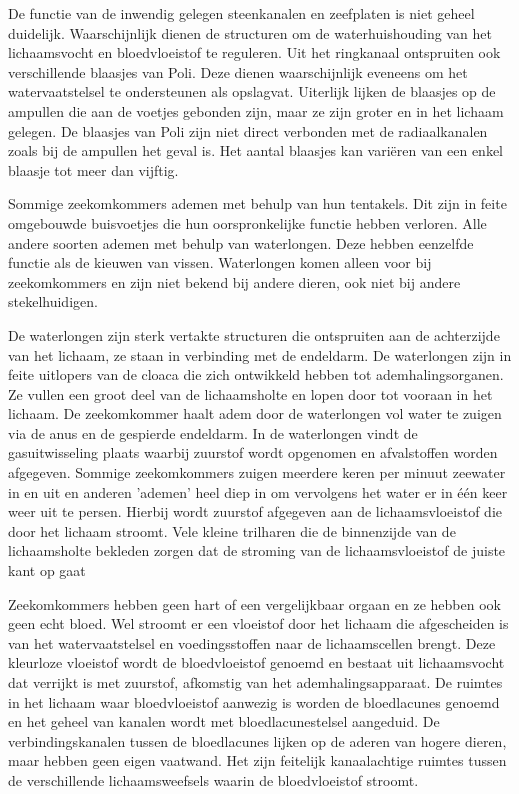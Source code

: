 De functie van de inwendig gelegen steenkanalen en zeefplaten is niet geheel duidelijk.
Waarschijnlijk dienen de structuren om de waterhuishouding van het lichaamsvocht en bloedvloeistof te reguleren.
Uit het ringkanaal ontspruiten ook verschillende blaasjes van Poli.
Deze dienen waarschijnlijk eveneens om het watervaatstelsel te ondersteunen als opslagvat.
Uiterlijk lijken de blaasjes op de ampullen die aan de voetjes gebonden zijn, maar ze zijn groter en in het lichaam gelegen.
De blaasjes van Poli zijn niet direct verbonden met de radiaalkanalen zoals bij de ampullen het geval is.
Het aantal blaasjes kan variëren van een enkel blaasje tot meer dan vijftig.

Sommige zeekomkommers ademen met behulp van hun tentakels.
Dit zijn in feite omgebouwde buisvoetjes die hun oorspronkelijke functie hebben verloren.
Alle andere soorten ademen met behulp van waterlongen.
Deze hebben eenzelfde functie als de kieuwen van vissen.
Waterlongen komen alleen voor bij zeekomkommers en zijn niet bekend bij andere dieren, ook niet bij andere stekelhuidigen.

De waterlongen zijn sterk vertakte structuren die ontspruiten aan de achterzijde van het lichaam, ze staan in verbinding met de endeldarm.
De waterlongen zijn in feite uitlopers van de cloaca die zich ontwikkeld hebben tot ademhalingsorganen.
Ze vullen een groot deel van de lichaamsholte en lopen door tot vooraan in het lichaam.
De zeekomkommer haalt adem door de waterlongen vol water te zuigen via de anus en de gespierde endeldarm.
In de waterlongen vindt de gasuitwisseling plaats waarbij zuurstof wordt opgenomen en afvalstoffen worden afgegeven.
Sommige zeekomkommers zuigen meerdere keren per minuut zeewater in en uit en anderen 'ademen' heel diep in om vervolgens het water er in één keer weer uit te persen.
Hierbij wordt zuurstof afgegeven aan de lichaamsvloeistof die door het lichaam stroomt.
Vele kleine trilharen die de binnenzijde van de lichaamsholte bekleden zorgen dat de stroming van de lichaamsvloeistof de juiste kant op gaat

Zeekomkommers hebben geen hart of een vergelijkbaar orgaan en ze hebben ook geen echt bloed.
Wel stroomt er een vloeistof door het lichaam die afgescheiden is van het watervaatstelsel en voedingsstoffen naar de lichaamscellen brengt.
Deze kleurloze vloeistof wordt de bloedvloeistof genoemd en bestaat uit lichaamsvocht dat verrijkt is met zuurstof, afkomstig van het ademhalingsapparaat.
De ruimtes in het lichaam waar bloedvloeistof aanwezig is worden de bloedlacunes genoemd en het geheel van kanalen wordt met bloedlacunestelsel aangeduid.
De verbindingskanalen tussen de bloedlacunes lijken op de aderen van hogere dieren, maar hebben geen eigen vaatwand.
Het zijn feitelijk kanaalachtige ruimtes tussen de verschillende lichaamsweefsels waarin de bloedvloeistof stroomt.

